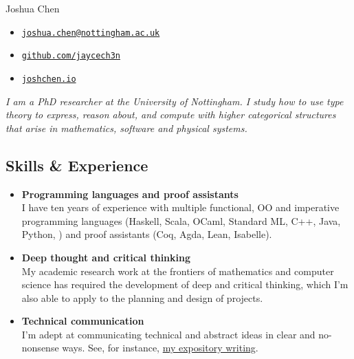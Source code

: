 \documentclass[12pt,a4paper]{article}
\author{}
\date{}
\providecommand{\tightlist}{%
  \setlength{\itemsep}{0pt}\setlength{\parskip}{0pt}}
\begin{document}
\newcommand{\httpsurl}[1]{\href{https://#1}{\nolinkurl{#1}}}
\newcommand{\pdficon}{{\scriptsize\faFilePdf[regular]}}
\newcommand{\pdf}[1]{\pdficon\hspace{0.8ex}\httpsurl{#1}}

\thispagestyle{fancy}

{\sc\huge Joshua Chen}
\vspace{1.5ex}
\begin{itemize}
\tightlist
\item[\small\faPaperPlane] \href{mailto:joshua.chen@nottingham.ac.uk}{\nolinkurl{joshua.chen@nottingham.ac.uk}}
\item[\small\faGithub] \httpsurl{github.com/jaycech3n}
\item[\small\faGlobe] \httpsurl{joshchen.io}
\end{itemize}
\vspace{1.5ex}
\textit{I am a PhD researcher at the University of Nottingham.
I study how to use type theory to express, reason about, and compute with higher categorical structures that arise in mathematics, software and physical systems.}

\subsection{Skills \& Experience}

\begin{itemize}
\item
  \textbf{Programming languages and proof assistants}\\[0.8ex]
  I have ten years of experience with multiple functional, OO and imperative programming languages (Haskell, Scala, OCaml, Standard ML, C++, Java, Python, \textellipsis) and proof assistants (Coq, Agda, Lean, Isabelle).

\item
  \textbf{Deep thought and critical thinking}\\[0.8ex]
  My academic research work at the frontiers of mathematics and computer science has required the development of deep and critical thinking, which I'm also able to apply to the planning and design of projects.

\item
  \textbf{Technical communication}\\[0.8ex]
  I'm adept at communicating technical and abstract ideas in clear and no-nonsense ways. See, for instance, \hyperref[subsec:expo-writing]{my expository writing}.

\end{itemize}
\end{document}
